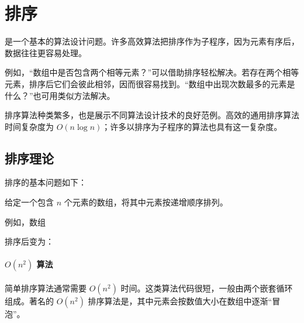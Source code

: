 \chapter{排序}


是一个基本的算法设计问题。许多高效算法把排序作为子程序，因为元素有序后，数据往往更容易处理。

例如，“数组中是否包含两个相等元素？”可以借助排序轻松解决。若存在两个相等元素，排序后它们会彼此相邻，因而很容易找到。“数组中出现次数最多的元素是什么？”也可用类似方法解决。

排序算法种类繁多，也是展示不同算法设计技术的良好范例。高效的通用排序算法时间复杂度为 $O(n \log n)$；许多以排序为子程序的算法也具有这一复杂度。

\section{排序理论}

排序的基本问题如下：
\begin{framed}
\noindent
给定一个包含 $n$ 个元素的数组，将其中元素按递增顺序排列。
\end{framed}
\noindent
例如，数组
\begin{center}
\end{center}
排序后变为：
\begin{center}
\end{center}

\subsubsection{$O(n^2)$ 算法}


简单排序算法通常需要 $O(n^2)$ 时间。这类算法代码很短，一般由两个嵌套循环组成。著名的 $O(n^2)$ 排序算法是，其中元素会按数值大小在数组中逐渐“冒泡”。

